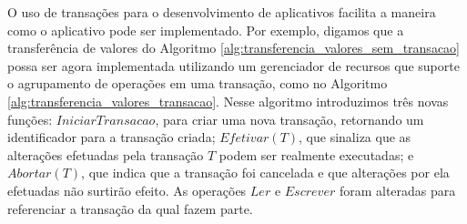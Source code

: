 \documentclass[11pt,twoside,a4paper]{book}
\begin{document}

O uso de transações para o desenvolvimento de aplicativos facilita a maneira como o aplicativo pode ser implementado. Por exemplo, digamos que a transferência de valores do Algoritmo \ref{alg:transferencia_valores_sem_transacao} possa ser agora implementada utilizando um gerenciador de recursos que suporte o agrupamento de operações em uma transação, como no Algoritmo \ref{alg:transferencia_valores_transacao}. Nesse algoritmo introduzimos três novas funções: $IniciarTransacao$, para criar uma nova transação, retornando um identificador para a transação criada; $Efetivar(T)$, que sinaliza que as alterações efetuadas pela transação $T$ podem ser realmente executadas; e $Abortar(T)$, que indica que a transação foi cancelada e que alterações por ela efetuadas não surtirão efeito. As operações $Ler$ e $Escrever$ foram alteradas para referenciar a transação da qual fazem parte.
\end{document}
